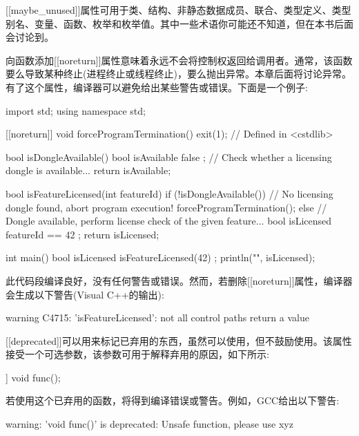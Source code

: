 [[maybe\_unused]]属性可用于类、结构、非静态数据成员、联合、类型定义、类型别名、变量、函数、枚举和枚举值。其中一些术语你可能还不知道，但在本书后面会讨论到。

\mySamllsection{[[noreturn]]}

向函数添加[[noreturn]]属性意味着永远不会将控制权返回给调用者。通常，该函数要么导致某种终止(进程终止或线程终止)，要么抛出异常。本章后面将讨论异常。有了这个属性，编译器可以避免给出某些警告或错误。下面是一个例子:

\begin{cpp}
import std;
using namespace std;

[[noreturn]] void forceProgramTermination()
{
    exit(1); // Defined in <cstdlib>
}

bool isDongleAvailable()
{
    bool isAvailable { false };
    // Check whether a licensing dongle is available...
    return isAvailable;
}

bool isFeatureLicensed(int featureId)
{
    if (!isDongleAvailable()) {
        // No licensing dongle found, abort program execution!
        forceProgramTermination();
    } else {
        // Dongle available, perform license check of the given feature...
        bool isLicensed { featureId == 42 };
        return isLicensed;
    }
}

int main()
{
    bool isLicensed { isFeatureLicensed(42) };
    println("{}", isLicensed);
}
\end{cpp}

此代码段编译良好，没有任何警告或错误。然而，若删除[[noreturn]]属性，编译器会生成以下警告(Visual C++的输出):

\begin{shell}
warning C4715: 'isFeatureLicensed': not all control paths return a value
\end{shell}

\mySamllsection{[[deprecated]]}

[[deprecated]]可以用来标记已弃用的东西，虽然可以使用，但不鼓励使用。该属性接受一个可选参数，该参数可用于解释弃用的原因，如下所示:

\begin{cpp}
[[deprecated("Unsafe function, please use xyz")]] void func();
\end{cpp}

若使用这个已弃用的函数，将得到编译错误或警告。例如，GCC给出以下警告:

\begin{shell}
warning: 'void func()' is deprecated: Unsafe function, please use xyz
\end{shell}

